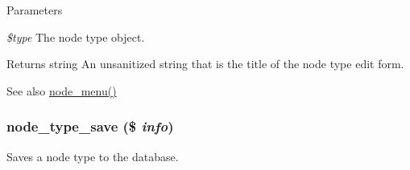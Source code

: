 \begin{DoxyParams}{Parameters}
\item[{\em \$type}]The node type object.\end{DoxyParams}
\begin{DoxyReturn}{Returns}
string An unsanitized string that is the title of the node type edit form.
\end{DoxyReturn}
\begin{DoxySeeAlso}{See also}
\hyperlink{node_8module_a15e8d85a7559f22b8f2c77c1d5dfac63}{node\_\-menu()} 
\end{DoxySeeAlso}
\hypertarget{node_8module_a9a5c06f9903cea586bd44a7d6e9e086c}{
\subsubsection[{node\_\-type\_\-save}]{\setlength{\rightskip}{0pt plus 5cm}node\_\-type\_\-save (\$ {\em info})}}
\label{node_8module_a9a5c06f9903cea586bd44a7d6e9e086c}
Saves a node type to the database.


